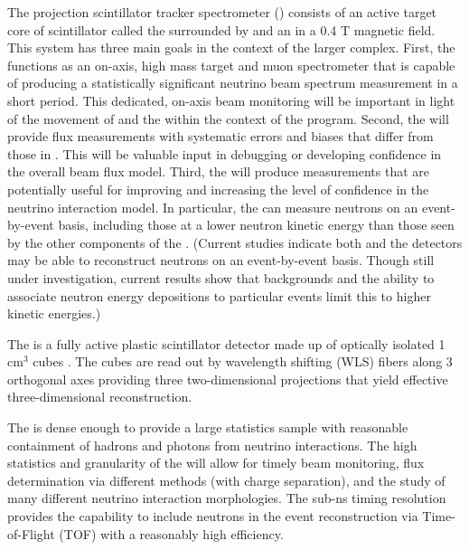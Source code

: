 The \threed projection scintillator tracker spectrometer () consists of an active target core of scintillator called the  surrounded by  and an  in a 0.4 T magnetic field.  This system has three main goals in the context of the larger  complex.  First, the  functions as an on-axis, high mass target and muon spectrometer that is capable of producing a statistically significant neutrino beam spectrum measurement in a short period.  This dedicated, on-axis beam monitoring will be important in light of the movement of  and the  within the context of the  program.  Second, the  will provide flux measurements with systematic errors and biases that differ from those in .  This will be valuable input in debugging or developing confidence in the overall beam flux model.  Third, the  will produce measurements that are potentially useful for improving and increasing the level of confidence in the neutrino interaction model. In particular, the  can measure neutrons on an event-by-event basis, including those at a lower neutron kinetic energy than those seen by the other components of the . (Current studies indicate both  and the  detectors may be able to reconstruct neutrons on an event-by-event basis.  Though still under investigation, current results show that backgrounds and the ability to associate neutron energy depositions to particular events limit this to higher kinetic energies.) 


The  is a fully active plastic scintillator detector made up of optically isolated 1 cm$^{3}$ cubes \cite{Sgalaberna:2017khy}.  The cubes are read out by wavelength shifting (WLS) fibers along 3 orthogonal axes providing three two-dimensional projections that yield effective three-dimensional reconstruction.  


The  is dense enough to provide a large statistics sample with reasonable containment of hadrons and photons from neutrino interactions. The high statistics and granularity  of the  will allow for timely beam monitoring, flux determination via different methods (with charge separation), and the study of many different neutrino interaction morphologies.  The sub-ns timing resolution provides the  capability to include neutrons in the event reconstruction via Time-of-Flight (TOF) with a reasonably high efficiency.  


